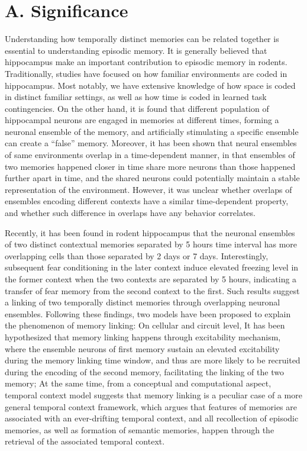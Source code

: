 \documentclass[master.tex]{subfiles}
\begin{document}
\section*{A. Significance}

Understanding how temporally distinct memories can be related together is
essential to understanding episodic memory. It is generally believed that
hippocampus make an important contribution to episodic memory in rodents.
Traditionally, studies have focused on how familiar environments are coded in
hippocampus. Most notably, we have extensive knowledge of how space is coded in
distinct familiar settings, as well as how time is coded in learned task
contingencies. On the other hand, it is found that different population of
hippocampal neurons are engaged in memories at different times, forming a
neuronal ensemble of the memory, and artificially stimulating a specific
ensemble can create a ``false'' memory. Moreover, it has been shown that neural
ensembles of same environments overlap in a time-dependent manner, in that
ensembles of two memories happened closer in time share more neurons than those
happened further apart in time, and the shared neurons could potentially
maintain a stable representation of the environment. However, it was unclear
whether overlaps of ensembles encoding different contexts have a similar
time-dependent property, and whether such difference in overlaps have any
behavior correlates.

Recently, it has been found in rodent hippocampus that the neuronal ensembles of
two distinct contextual memories separated by 5 hours time interval has more
overlapping cells than those separated by 2 days or 7 days. Interestingly,
subsequent fear conditioning in the later context induce elevated freezing level
in the former context when the two contexts are separated by 5 hours, indicating
a transfer of fear memory from the second context to the first. Such results
suggest a linking of two temporally distinct memories through overlapping
neuronal ensembles. Following these findings, two models have been proposed to
explain the phenomenon of memory linking: On cellular and circuit level, It has
been hypothesized that memory linking happens through excitability mechanism,
where the ensemble neurons of first memory sustain an elevated excitability
during the memory linking time window, and thus are more likely to be recruited
during the encoding of the second memory, facilitating the linking of the two
memory; At the same time, from a conceptual and computational aspect, temporal
context model suggests that memory linking is a peculiar case of a more general
temporal context framework, which argues that features of memories are
associated with an ever-drifting temporal context, and all recollection of
episodic memories, as well as formation of semantic memories, happen through the
retrieval of the associated temporal context.
\end{document}
